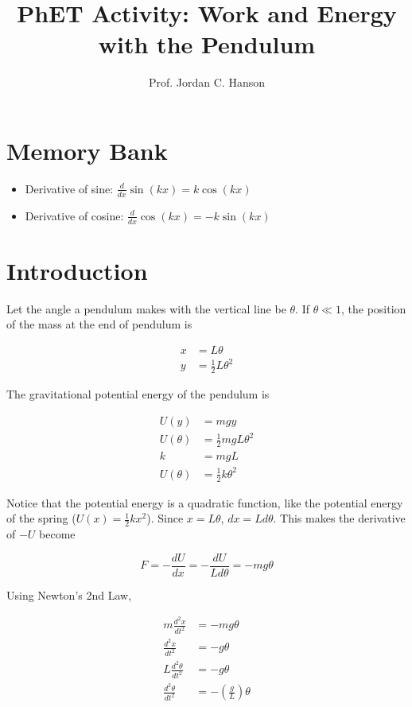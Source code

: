 \documentclass{article}
\begin{document}
\twocolumn

\title{PhET Activity: Work and Energy with the Pendulum}
\author{Prof. Jordan C. Hanson}

\maketitle

\section{Memory Bank}

\begin{itemize}
\item Derivative of sine: $\frac{d}{dx} \sin(kx) = k\cos(kx)$
\item Derivative of cosine: $\frac{d}{dx} \cos(kx) = -k\sin(kx)$
\end{itemize}

\section{Introduction}

Let the angle a pendulum makes with the vertical line be $\theta$.  If $\theta \ll 1$, the position of the mass at the end of pendulum is

\begin{align}
x &= L\theta \\
y &= \frac{1}{2}L\theta^2
\end{align}

The gravitational potential energy of the pendulum is 

\begin{align}
U(y) &= mgy \\
U(\theta) &= \frac{1}{2}mgL\theta^2 \\
k &= mgL \\
U(\theta) &= \frac{1}{2}k\theta^2
\end{align}

Notice that the potential energy is a quadratic function, like the potential energy of the spring ($U(x) = \frac{1}{2} k x^2$).  Since $x = L\theta$, $dx = Ld\theta$.  This makes the derivative of $-U$ become

\begin{equation}
F = -\frac{dU}{dx} = -\frac{dU}{Ld\theta} = -mg\theta
\end{equation}

Using Newton's 2nd Law,

\begin{align}
m \frac{d^2 x}{dt^2} &= -mg\theta \\
\frac{d^2 x}{dt^2} &= -g\theta \\
L\frac{d^2 \theta}{dt^2} &= -g\theta \\
\frac{d^2 \theta}{dt^2} &= -\left(\frac{g}{L}\right)\theta \label{eq:1}
\end{align}
\end{document}
